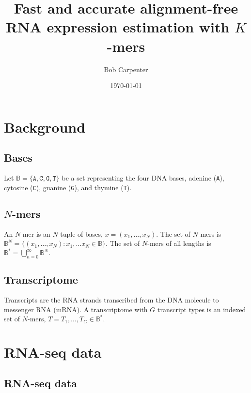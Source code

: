 \documentclass{article}
\title{Fast and accurate alignment-free RNA expression estimation with $K$-mers}
\author{Bob Carpenter}
\date{\today}
\begin{document}
\maketitle


\section{Background}

\subsection{Bases}

Let
$\mathbb{B} = \{ \texttt{A}, \texttt{C}, \texttt{G}, \texttt{T} \}$ be
a set representing the four DNA bases, adenine (\texttt{A}), cytosine
(\texttt{C}), guanine (\texttt{G}), and thymine (\texttt{T}).

\subsection{$N$-mers}

An $N$-mer is an $N$-tuple of bases,
$x = (x_1, \ldots, x_N)$.  The set of $N$-mers is
$\mathbb{B}^N = \{ (x_1, \ldots, x_N) : x_1, \ldots x_N \in
\mathbb{B}\}$.  The set of $N$-mers of all lengths is
$\mathbb{B}^* = \bigcup_{n=0}^{\infty} \mathbb{B}^N.$

\subsection{Transcriptome}

Transcripts are the RNA strands transcribed from the DNA molecule to
messenger RNA (mRNA).  A transcriptome with $G$ transcript types is an
indexed set of $N$-mers, $T = T_1, \ldots, T_G \in
\mathbb{B}^*$.


\section{RNA-seq data}

\subsection{RNA-seq data}
\end{document}
